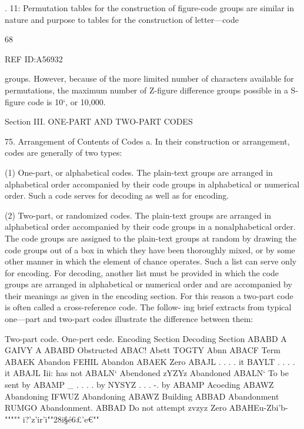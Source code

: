. 11: Permutation tables for the construction of ﬁgure-code groups are
similar in nature and purpose to tables for the construction of letter—code

68

REF ID:A56932

groups. However, because of the more limited number of characters
available for permutations, the maximum number of Z-ﬁgure difference
groups possible in a S-ﬁgure code is 10‘, or 10,000.

Section III. ONE-PART AND TWO-PART CODES

75. Arrangement of Contents of Codes
a. In their construction or arrangement, codes are generally of two
types:

(1) One-part, or alphabetical codes. The plain-text groups are
arranged in alphabetical order accompanied by their code groups
in alphabetical or numerical order. Such a code serves for
decoding as well as for encoding.

(2) Two-part, or randomized codes. The plain-text groups are
arranged in alphabetical order accompanied by their code groups
in a nonalphabetical order. The code groups are assigned to
the plain-text groups at random by drawing the code groups out
of a box in which they have been thoroughly mixed, or by
some other manner in which the element of chance operates.
Such a list can serve only for encoding. For decoding, another
list must be provided in which the code groups are arranged
in alphabetical or numerical order and are accompanied by their
meanings as given in the encoding section. For this reason a
two-part code is often called a cross-reference code. The follow-
ing brief extracts from typical one—part and two-part codes
illustrate the difference between them:

 

 

 

 

 

 

Two-part code.
One-pert cede.
Encoding Section Decoding Section
ABABD A GAIVY A ABABD Obstructed
ABAC! Abett TOGTY Abnn ABACF Term
ABAEK Abandon FEHIL Abandon ABAEK Zero
ABAJL . . . . it BAYLT . . . . it ABAJL Iii: has not
ABALN‘ Abendoned zYZYz Abandoned ABALN‘ To be sent by
ABAMP _ . . . . by NYSYZ . . . -. by ABAMP Acoeding
ABAWZ Abandoning IFWUZ Abandoning ABAWZ Building
ABBAD Abandonment RUMGO Abandonment. ABBAD Do not attempt
zvzyz Zero ABAHEu-Zbi'b- """"" i?’z'ir'i""28i§é6£'e€""

